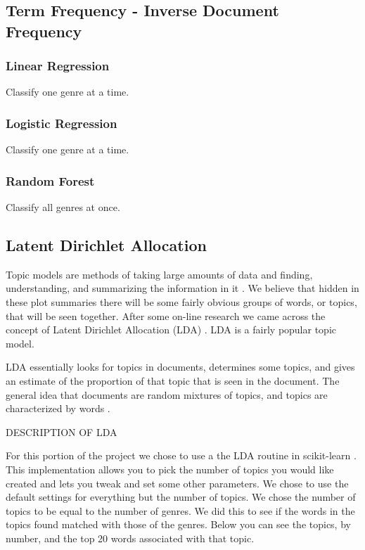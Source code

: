 \documentclass[11pt]{article}
\begin{document}
\subsection{Term Frequency - Inverse Document Frequency}
\label{sec:tfidf}

\subsubsection{Linear Regression}

Classify one genre at a time.

\subsubsection{Logistic Regression}

Classify one genre at a time.

\subsubsection{Random Forest}

Classify all genres at once.

\subsection{Latent Dirichlet Allocation}
\label{sec:lda}

Topic models are methods of taking large amounts of data and finding, understanding, and summarizing the information in it \cite{wiki:topic_model, kdnuggets:topic_model}. We believe that hidden in these plot summaries there will be some fairly obvious groups of words, or topics, that will be seen together. After some on-line research we came across the concept of Latent Dirichlet Allocation (LDA) \cite{blei2003}. LDA is a fairly popular topic model. 

LDA essentially looks for topics in documents, determines some topics, and gives an estimate of the proportion of that topic that is seen in the document. The general idea that documents are random mixtures of topics, and topics are characterized by words \cite{blei2003}. 

DESCRIPTION OF LDA

For this portion of the project we chose to use a the LDA routine in scikit-learn \cite{scikit-learn}. This implementation allows you to pick the number of topics you would like created and lets you tweak and set some other parameters. We chose to use the default settings for everything but the number of topics. We chose the number of topics to be equal to the number of genres. We did this to see if the words in the topics found matched with those of the genres. Below you can see the topics, by number, and the top 20 words associated with that topic.
\end{document}
